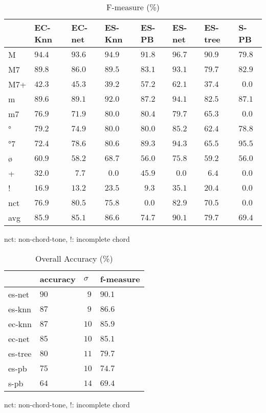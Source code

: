 \documentclass{article}
\begin{document}
\begin{table}
  \centering
  \begin{tabular}{l|p{.5cm}p{.5cm}p{.5cm}p{.5cm}p{.5cm}p{.5cm}p{.5cm}}
         
   &EC-Knn &EC-net &ES-Knn &ES-PB  &ES-net &ES-tree&S-PB   \\
\hline                                            
M  &$ 94.4$&$ 93.6$&$ 94.9$&$ 91.8$&$ 96.7$&$ 90.9$&$ 79.8$\\
M7 &$ 89.8$&$ 86.0$&$ 89.5$&$ 83.1$&$ 93.1$&$ 79.7$&$ 82.9$\\
M7+&$ 42.3$&$ 45.3$&$ 39.2$&$ 57.2$&$ 62.1$&$ 37.4$&$~~0.0$\\
m  &$ 89.6$&$ 89.1$&$ 92.0$&$ 87.2$&$ 94.1$&$ 82.5$&$ 87.1$\\
m7 &$ 76.9$&$ 71.9$&$ 80.0$&$ 80.4$&$ 79.7$&$ 65.3$&$~~0.0$\\
°  &$ 79.2$&$ 74.9$&$ 80.0$&$ 80.0$&$ 85.2$&$ 62.4$&$ 78.8$\\
°7 &$ 72.4$&$ 78.6$&$ 80.6$&$ 89.3$&$ 94.3$&$ 65.5$&$ 95.5$\\
ø  &$ 60.9$&$ 58.2$&$ 68.7$&$ 56.0$&$ 75.8$&$ 59.2$&$ 56.0$\\
+  &$ 32.0$&$~~7.7$&$~~0.0$&$ 45.9$&$~~0.0$&$~~6.4$&$~~0.0$\\
!  &$ 16.9$&$ 13.2$&$ 23.5$&$~~9.3$&$ 35.1$&$ 20.4$&$~~0.0$\\
nct&$ 76.9$&$ 80.5$&$ 75.8$&$~~0.0$&$ 82.9$&$ 70.5$&$~~0.0$\\
avg&$ 85.9$&$ 85.1$&$ 86.6$&$ 74.7$&$ 90.1$&$ 79.7$&$ 69.4$\\

  \end{tabular}                                                        

\medskip

nct: non-chord-tone, !: incomplete chord
  \caption{F-measure (\%)}
  \label{tab:f-measure}
\end{table}



\begin{table}
  \centering
  \begin{tabular}{l|p{1.5cm}p{.5cm}p{1.5cm}}
       & accuracy& $\sigma$  & f-measure\\
\hline
es-net &$   90  $&$~~9$      &$90.1$ \\
es-knn &$   87  $&$~~9$      &$86.6$ \\
ec-knn &$   87  $&$ 10$      &$85.9$ \\
ec-net &$   85  $&$ 10$      &$85.1$ \\
es-tree&$   80  $&$ 11$      &$79.7$ \\
es-pb  &$   75  $&$ 10$      &$74.7$ \\
s-pb   &$   64  $&$ 14$      &$69.4$ \\

  \end{tabular}                                                        

\medskip

nct: non-chord-tone, !: incomplete chord
  \caption{Overall Accuracy (\%)}
  \label{tab:accuracy}
\end{table}
\end{document}
